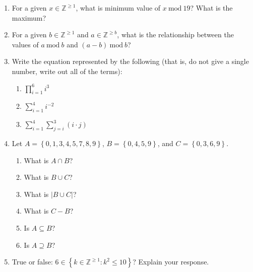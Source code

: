 \documentclass[11pt, oneside]{article}   	%
\renewcommand{\mod}{\ \mathrm{mod}\ }
\begin{document}
\begin{enumerate}


\item
For a given $x\in\mathbb{Z}^{\ge1}$, what is minimum value of \underline{$x\mod 19$}? What is the maximum? 
\vspace{3em}

\item 
For a given $b\in\mathbb{Z}^{\ge1}$ and $a \in\mathbb{Z}^{\ge b}$, what is the relationship between the values of \underline{$a\mod b$} and \underline{$(a - b) \mod b$}?
\vspace{3em}

\item Write the equation represented by the following (that is, do not give a single number, write out all of the terms):
\begin{enumerate}
\item $\displaystyle\prod_{i=1}^{6} i^3$\vspace{2em}
\item $\displaystyle\sum_{i=1}^{4} i^{-2}$\vspace{2em}
\item $\displaystyle\sum_{i=1}^{4}\sum_{j=i}^{3} (i \cdot j)$\vspace{2em}
\end{enumerate}

\item 
Let $A = \left\{0,1,3,4,5,7,8,9\right\}$, $B = \left\{0,4,5,9\right\}$, and $C = \left\{0,3,6,9\right\}$.
\begin{enumerate}
\item What is $A\cap B$? \vspace{2em}
\item What is $B\cup C$? \vspace{2em}
\item What is $|B\cup C|$? \vspace{2em}
\item What is $C-B$? \vspace{2em}
\item Is $A \subseteq B$?\vspace{2em}
\item Is $A \supseteq B$?\vspace{2em}

\end{enumerate}


\item True or false: $6 \in \left\{k \in \mathbb{Z}^{\ge1} : k^2 \le 10\right\}$? Explain your response. \vspace{3em}


\end{enumerate}
\end{document}
